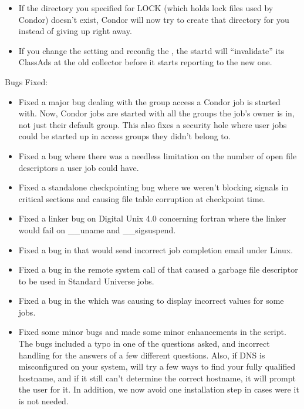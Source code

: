 \begin{itemize}
\item If the directory you specified for LOCK (which holds lock files
used by Condor) doesn't exist, Condor will now try to create that
directory for you instead of giving up right away.

\item If you change the  setting and reconfig
the , the startd will ``invalidate'' its ClassAds at
the old collector before it starts reporting to the new one.

\end{itemize}

\noindent Bugs Fixed:

\begin{itemize}

\item Fixed a major bug dealing with the group access a Condor job is
started with.
Now, Condor jobs are started with all the groups the job's owner is
in, not just their default group.
This also fixes a security hole where user jobs could be started up in
access groups they didn't belong to.

\item Fixed a bug where there was a needless limitation on the number of open
file descriptors a user job could have.

\item Fixed a standalone checkpointing bug where we weren't blocking signals
in critical sections and causing file table corruption at checkpoint
time.

\item Fixed a linker bug on Digital Unix 4.0 concerning fortran where
the linker would fail on \_\_uname and \_\_sigsuspend.

\item Fixed a bug in  that would send incorrect job
completion email under Linux.

\item Fixed a bug in the remote system call of  that caused
a garbage file descriptor to be used in Standard Universe jobs.

\item Fixed a bug in the  which was causing 
 to display incorrect values for some jobs.

\item Fixed some minor bugs and made some minor enhancements in the
 script.
The bugs included a typo in one of the questions asked, and incorrect
handling for the answers of a few different questions.
Also, if DNS is misconfigured on your system,  will
try a few ways to find your fully qualified hostname, and if it still
can't determine the correct hostname, it will prompt the user for it. 
In addition, we now avoid one installation step in cases were it is
not needed. 


\end{itemize}
